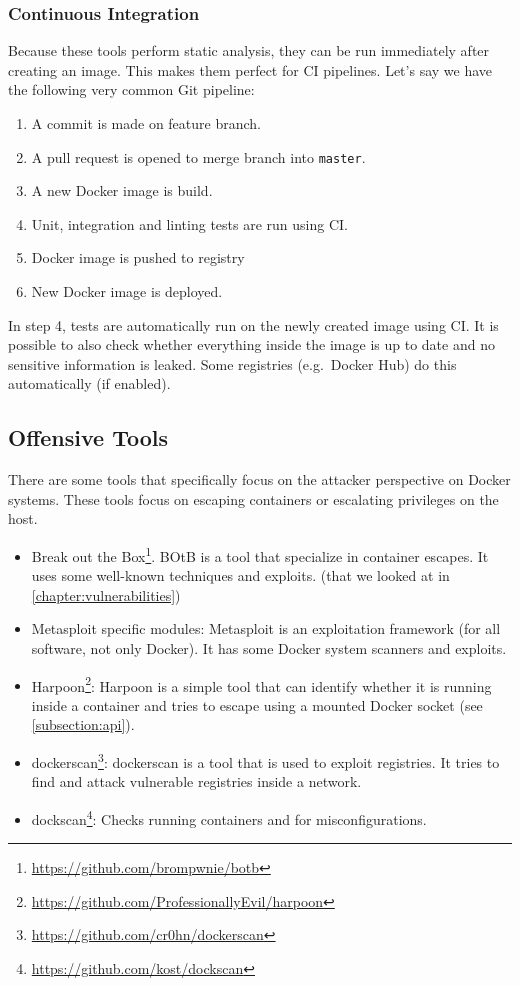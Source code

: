 \subsubsection{Continuous Integration}
Because these tools perform static analysis, they can be run immediately after creating an image. This makes them perfect for CI pipelines. Let's say we have the following very common Git pipeline:
\begin{enumerate}
    \item A commit is made on feature branch.
    \item A pull request is opened to merge branch into \lstinline{master}.
    \item A new Docker image is build.
    \item Unit, integration and linting tests are run using CI\@.
    \item Docker image is pushed to registry
    \item New Docker image is deployed.
\end{enumerate}

In step 4, tests are automatically run on the newly created image using CI\@. It is possible to also check whether everything inside the image is up to date and no sensitive information is leaked. Some registries (e.g.\ Docker Hub) do this automatically (if enabled).

\subsection{Offensive Tools}\label{subsection:offensive-tools}
There are some tools that specifically focus on the attacker perspective on Docker systems. These tools focus on escaping containers or escalating privileges on the host.

\begin{itemize}
    \item Break out the Box\footnote{\url{https://github.com/brompwnie/botb}}. BOtB is a tool that specialize in container escapes. It uses some well-known techniques and exploits. (that we looked at in \autoref{chapter:vulnerabilities})
    \item Metasploit specific modules: Metasploit is an exploitation framework (for all software, not only Docker). It has some Docker system scanners and exploits\cite{Docker-Credentials-Metasploit}\cite{Metasploit-Linux-Gather-Container-Detection}\cite{Metasploit-Unprotected-TCP-Socket}.
    \item Harpoon\footnote{\url{https://github.com/ProfessionallyEvil/harpoon}}: Harpoon is a simple tool that can identify whether it is running inside a container and tries to escape using a mounted Docker socket (see \autoref{subsection:api}).
    \item dockerscan\footnote{\url{https://github.com/cr0hn/dockerscan}}: dockerscan is a tool that is used to exploit registries. It tries to find and attack vulnerable registries inside a network.
    \item dockscan\footnote{\url{https://github.com/kost/dockscan}}: Checks running containers and for misconfigurations.
\end{itemize}

